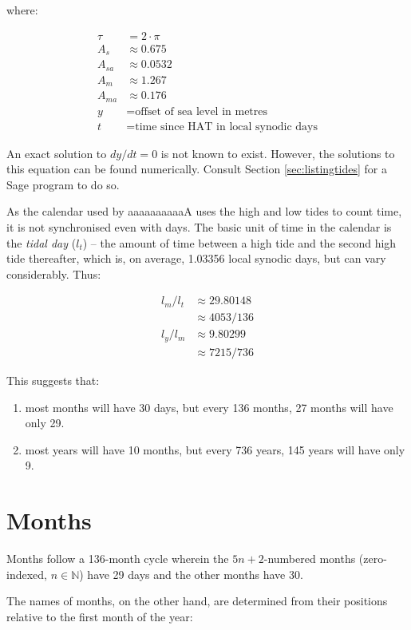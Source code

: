 \documentclass{book}
\newcommand{\lname}{aaaaaaaaaaA}
\begin{document}
where:

\begin{align*}
    \tau &= 2 \cdot \pi \\
    A_s &\approx 0.675 \\
    A_{sa} &\approx 0.0532 \\
    A_m &\approx 1.267 \\
    A_{ma} &\approx 0.176 \\
    y &= \text{offset of sea level in metres} \\
    t &= \text{time since HAT in local synodic days}
\end{align*}

An exact solution to $dy/dt = 0$ is not known to exist. However, the solutions to this equation can be found numerically. Consult Section \ref{sec:listingtides} for a Sage program to do so.

As the calendar used by \lname{} uses the high and low tides to count time, it is not synchronised even with days. The basic unit of time in the calendar is the \emph{tidal day}  ($l_t$) -- the amount of time between a high tide and the second high tide thereafter, which is, on average, 1.03356 local synodic days, but can vary considerably. Thus:

\begin{align}
    l_m / l_t &\approx 29.80148 \\
    &\approx 4053/136 \\
    l_y / l_m &\approx 9.80299 \\
    &\approx 7215/736
\end{align}

This suggests that:

\begin{enumerate}
    \item most months will have 30 days, but every 136 months, 27 months will have only 29.
    \item most years will have 10 months, but every 736 years, 145 years will have only 9.
\end{enumerate}

\section{Months}

Months follow a 136-month cycle wherein the $5n + 2$-numbered months (zero-indexed, $n \in \mathbb{N}$) have 29 days and the other months have 30.

The names of months, on the other hand, are determined from their positions relative to the first month of the year:
\end{document}
